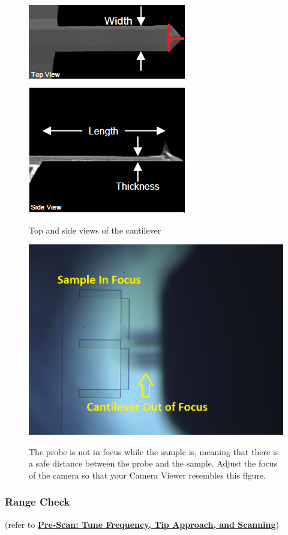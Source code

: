 \documentclass{../lab}
\begin{document}
\begin{figure}[H]
    \centering
    \href{http://experimentationlab.berkeley.edu/sites/default/files/AFMImages/26.png}{\includegraphics[width=0.5\linewidth]{images/26.png}}
    \caption{Top and side views of the cantilever}
\end{figure}

\begin{figure}[H]
    \centering
    \href{http://experimentationlab.berkeley.edu/sites/default/files/AFMImages/probe_unfocused1_0.png}{\includegraphics[width=0.5\linewidth]{images/probe_unfocused1_0.png}}
    \caption{The probe is not in focus while the sample is, meaning that there is a safe distance between the probe and the sample.  Adjust the focus of the camera so that your Camera Viewer resembles this figure.}
    \label{fig:ProbeUnfocused}
\end{figure}

\subsubsection{Range Check}
\label{subsubsec:RangeCheck}

(refer to \href{http://experimentationlab.berkeley.edu/sites/default/files/prescan\_final2.mp4}{\textbf{Pre-Scan: Tune Frequency, Tip Approach, and Scanning}})
\end{document}
